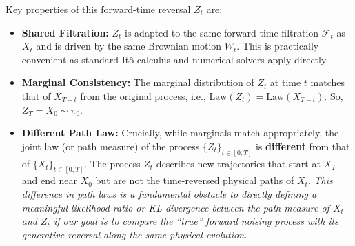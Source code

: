 Key properties of this forward-time reversal $Z_t$ are:
\begin{itemize}
    \item \textbf{Shared Filtration:} $Z_t$ is adapted to the same forward-time filtration $\mathcal{F}_t$ as $X_t$ and is driven by the same Brownian motion $W_t$. This is practically convenient as standard Itô calculus and numerical solvers apply directly.
    \item \textbf{Marginal Consistency:} The marginal distribution of $Z_t$ at time $t$ matches that of $X_{T-t}$ from the original process, i.e., $\text{Law}(Z_t) = \text{Law}(X_{T-t})$. So, $Z_T = X_0 \sim \pi_0$.
    \item \textbf{Different Path Law:} Crucially, while marginals match appropriately, the joint law (or path measure) of the process $\{Z_t\}_{t \in [0,T]}$ is \textbf{different} from that of $\{X_t\}_{t \in [0,T]}$. The process $Z_t$ describes new trajectories that start at $X_T$ and end near $X_0$ but are not the time-reversed physical paths of $X_t$. \emph{This difference in path laws is a fundamental obstacle to directly defining a meaningful likelihood ratio or KL divergence between the path measure of $X_t$ and $Z_t$ if our goal is to compare the ``true'' forward noising process with its generative reversal along the same physical evolution.}
\end{itemize}



